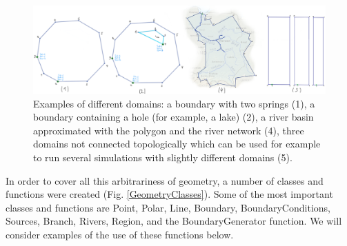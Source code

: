 \documentclass[]{pracamgr}
\begin{document}
      \begin{figure}[H]
        \centering
        \includegraphics[width=1\textwidth]{figs/geometry_examples.png}
        \caption{Examples of different domains: a boundary with two springs (1), a boundary containing a hole (for example, a lake) (2), a river basin approximated with the polygon and the river network (4), three domains not connected topologically which can be used for example to run several simulations with slightly different domains (5).}
        \label{geometry_examples}
      \end{figure}
      
      In order to cover all this arbitrariness of geometry, a number of classes and functions were created (Fig. \ref{GeometryClasses}). Some of the most important classes and functions are Point, Polar, Line, Boundary, BoundaryConditions, Sources, Branch, Rivers, Region, and the BoundaryGenerator function. We will consider examples of the use of these functions below.
      
\end{document}
